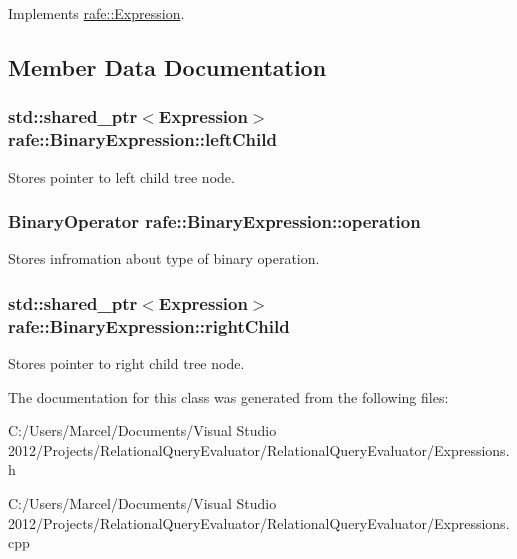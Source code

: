 Implements \hyperlink{classrafe_1_1_expression_a841879e8eb85f4bb68cfeec24231a701}{rafe\+::\+Expression}.



\subsection{Member Data Documentation}
\hypertarget{classrafe_1_1_binary_expression_a1c428205f0d4d597a6307e7cab39ee21}{
\subsubsection[{left\+Child}]{\setlength{\rightskip}{0pt plus 5cm}std\+::shared\+\_\+ptr$<${\bf Expression}$>$ rafe\+::\+Binary\+Expression\+::left\+Child}}\label{classrafe_1_1_binary_expression_a1c428205f0d4d597a6307e7cab39ee21}
Stores pointer to left child tree node. \hypertarget{classrafe_1_1_binary_expression_a7180ae7c20f907d52a0f9c8521d5c111}{
\subsubsection[{operation}]{\setlength{\rightskip}{0pt plus 5cm}Binary\+Operator rafe\+::\+Binary\+Expression\+::operation}}\label{classrafe_1_1_binary_expression_a7180ae7c20f907d52a0f9c8521d5c111}
Stores infromation about type of binary operation. \hypertarget{classrafe_1_1_binary_expression_ad915f6160c53ad08803e30db1ffc8e1c}{
\subsubsection[{right\+Child}]{\setlength{\rightskip}{0pt plus 5cm}std\+::shared\+\_\+ptr$<${\bf Expression}$>$ rafe\+::\+Binary\+Expression\+::right\+Child}}\label{classrafe_1_1_binary_expression_ad915f6160c53ad08803e30db1ffc8e1c}
Stores pointer to right child tree node. 

The documentation for this class was generated from the following files\+:\begin{DoxyCompactItemize}
\item 
C\+:/\+Users/\+Marcel/\+Documents/\+Visual Studio 2012/\+Projects/\+Relational\+Query\+Evaluator/\+Relational\+Query\+Evaluator/Expressions.\+h\item 
C\+:/\+Users/\+Marcel/\+Documents/\+Visual Studio 2012/\+Projects/\+Relational\+Query\+Evaluator/\+Relational\+Query\+Evaluator/Expressions.\+cpp\end{DoxyCompactItemize}
